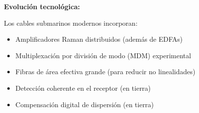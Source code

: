 \documentclass[11pt,a4paper]{article}
\begin{document}
\textbf{Evolución tecnológica:}

Los cables submarinos modernos incorporan:
\begin{itemize}
    \item Amplificadores Raman distribuidos (además de EDFAs)
    \item Multiplexación por división de modo (MDM) experimental
    \item Fibras de área efectiva grande (para reducir no linealidades)
    \item Detección coherente en el receptor (en tierra)
    \item Compensación digital de dispersión (en tierra)
\end{itemize}
\end{document}
